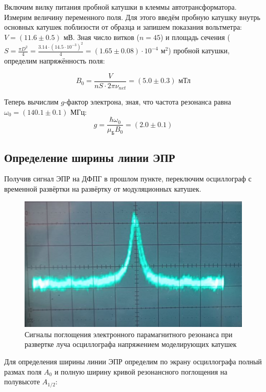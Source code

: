 \documentclass[a4paper, 12pt]{article}
\begin{document}
    Включим вилку питания пробной катушки в клеммы автотрансформатора. Измерим величину переменного поля. Для этого введём пробную катушку внутрь основных катушек поблизости от образца и запишем показания вольтметра: $V = \left( 11.6 \pm 0.5 \right) \text{ мВ}$. Зная число витков ($n = 45$) и площадь сечения ($S = \frac{\pi D^2}{4} = \frac{3.14 \cdot (14.5 \cdot 10^{-3})^2}{4} = \left( 1.65 \pm 0.08 \right) \cdot 10^{-4} \text{ м}^2$) пробной катушки, определим напряжённость поля:

    $$
    B_0 = \frac{V}{nS \cdot 2\pi\nu_{net}} = \left(5.0 \pm 0.3 \right) \text{ мТл}
    $$

    Теперь вычислим $g$-фактор электрона, зная, что частота резонанса равна \(\omega_0 = \left( 140.1 \pm 0.1 \right) \text{ МГц}\):
    $$
    g = \frac{\hbar\omega_0}{\mu_{\text{Б}}B_0} = \left( 2.0 \pm 0.1 \right) 
    $$

    \subsection{Определение ширины линии ЭПР}
    
    Получив сигнал ЭПР на ДФПГ в прошлом пункте, переключим осциллограф с временной развёртки на развёртку от модуляционных катушек.

    \begin{figure}[H]
        \centering
        \includegraphics[width = 14 cm]{images/osc_X_Y.png}
        \caption{Сигналы поглощения электронного парамагнитного резонанса при развертке луча осциллографа напряжением моделирующих катушек}
        \label{img:osc_X_Y}
    \end{figure}

    Для определения ширины линии ЭПР определим по экрану осциллографа полный размах поля $A_0$ и полную ширину кривой резонансного поглощения на полувысоте $A_{1/2}$:
\end{document}
